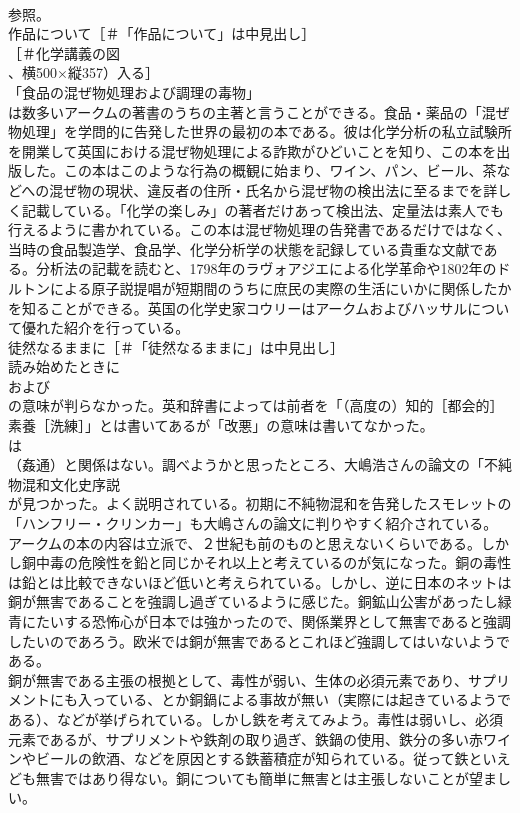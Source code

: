 \documentclass[8pt]{extreport}
\begin{document}
\begin{CJK}{UTF8}{min}
\\	参照。
\\	作品について［＃「作品について」は中見出し］
\\	［＃化学講義の図
\\	、横500×縦357）入る］
\\	「食品の混ぜ物処理および調理の毒物」
\\	は数多いアークムの著書のうちの主著と言うことができる。食品・薬品の「混ぜ物処理」を学問的に告発した世界の最初の本である。彼は化学分析の私立試験所を開業して英国における混ぜ物処理による詐欺がひどいことを知り、この本を出版した。この本はこのような行為の概観に始まり、ワイン、パン、ビール、茶などへの混ぜ物の現状、違反者の住所・氏名から混ぜ物の検出法に至るまでを詳しく記載している。「化学の楽しみ」の著者だけあって検出法、定量法は素人でも行えるように書かれている。この本は混ぜ物処理の告発書であるだけではなく、当時の食品製造学、食品学、化学分析学の状態を記録している貴重な文献である。分析法の記載を読むと、1798年のラヴォアジエによる化学革命や1802年のドルトンによる原子説提唱が短期間のうちに庶民の実際の生活にいかに関係したかを知ることができる。英国の化学史家コウリーはアークムおよびハッサルについて優れた紹介を行っている。
\\	徒然なるままに［＃「徒然なるままに」は中見出し］
\\	読み始めたときに 
\\	および 
\\	の意味が判らなかった。英和辞書によっては前者を「（高度の）知的［都会的］素養［洗練］」とは書いてあるが「改悪」の意味は書いてなかった。
\\	は 
\\	（姦通）と関係はない。調べようかと思ったところ、大嶋浩さんの論文の「不純物混和文化史序説
\\	が見つかった。よく説明されている。初期に不純物混和を告発したスモレットの「ハンフリー・クリンカー」も大嶋さんの論文に判りやすく紹介されている。
\\	アークムの本の内容は立派で、２世紀も前のものと思えないくらいである。しかし銅中毒の危険性を鉛と同じかそれ以上と考えているのが気になった。銅の毒性は鉛とは比較できないほど低いと考えられている。しかし、逆に日本のネットは銅が無害であることを強調し過ぎているように感じた。銅鉱山公害があったし緑青にたいする恐怖心が日本では強かったので、関係業界として無害であると強調したいのであろう。欧米では銅が無害であるとこれほど強調してはいないようである。
\\	銅が無害である主張の根拠として、毒性が弱い、生体の必須元素であり、サプリメントにも入っている、とか銅鍋による事故が無い（実際には起きているようである）、などが挙げられている。しかし鉄を考えてみよう。毒性は弱いし、必須元素であるが、サプリメントや鉄剤の取り過ぎ、鉄鍋の使用、鉄分の多い赤ワインやビールの飲酒、などを原因とする鉄蓄積症が知られている。従って鉄といえども無害ではあり得ない。銅についても簡単に無害とは主張しないことが望ましい。

\end{CJK}
\end{document}
